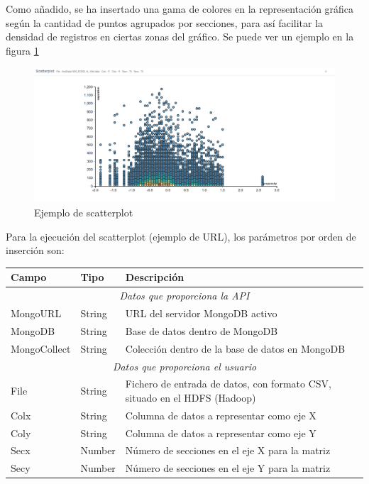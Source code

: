 Como añadido, se ha insertado una gama de colores en la representación gráfica según la cantidad de puntos agrupados por secciones, para así facilitar la densidad de registros en ciertas zonas del gráfico.  Se puede ver un ejemplo en la figura \ref{fig:ejemploscatterplot}
\begin{figure}
	\centering
	\includegraphics[width=1\linewidth]{imagenes/ejemplo_scatterplot}
	\caption{Ejemplo de scatterplot}
	\label{fig:ejemploscatterplot}
\end{figure}

Para la ejecución del scatterplot (ejemplo de URL\footnotemark), los parámetros por orden de inserción son:

\begin{tabular}{|l|l|p{7cm}|}
	\hline 
	\textbf{Campo} & \textbf{Tipo} & \textbf{Descripción} \\ 
	\hline \hline
	\multicolumn{3}{|c|}{\textit{Datos que proporciona la API}} \\
	\hline 
	MongoURL & String & URL del servidor MongoDB activo \\ 
	\hline 
	MongoDB & String & Base de datos dentro de MongoDB \\ 
	\hline 
	MongoCollect& String & Colección dentro de la base de datos en MongoDB \\ 
	\hline \hline
	\multicolumn{3}{|c|}{\textit{Datos que proporciona el usuario}} \\
	\hline 
	File & String & Fichero de entrada de datos, con formato CSV, situado en el HDFS (Hadoop) \\ 
	\hline 
	Colx & String & Columna de datos a representar como eje X \\ 
	\hline 
	Coly & String & Columna de datos a representar como eje Y \\ 
	\hline 
	Secx & Number & Número de secciones en el eje X para la matriz \\ 
	\hline 
	Secy & Number & Número de secciones en el eje Y para la matriz \\ 
	\hline 
\end{tabular} 

